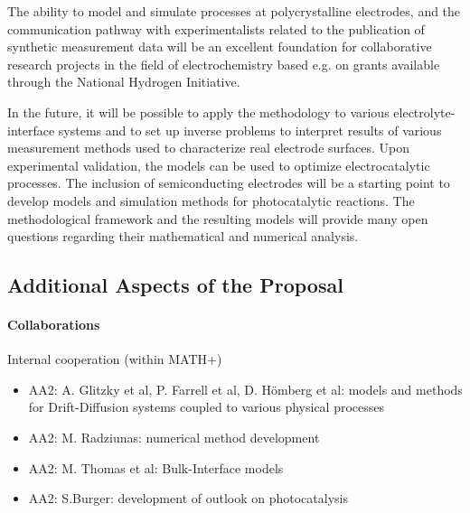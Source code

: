 \documentclass[a4paper,10pt]{article}
\begin{document}
The ability to model and simulate processes at polycrystalline electrodes, and the communication pathway with experimentalists related to the publication of synthetic measurement data will be an excellent foundation
for collaborative research projects in the field of electrochemistry based e.g. on grants available through
the National Hydrogen Initiative.

In the future, it will be possible to apply the methodology to various electrolyte-interface systems
and to set up inverse problems to interpret results of various measurement methods used to characterize real electrode surfaces. Upon experimental validation, the models can be used to optimize electrocatalytic processes.
The inclusion of semiconducting electrodes will be a starting point to develop models and simulation methods
for photocatalytic reactions.
The methodological framework and the resulting models will provide many open questions regarding their
mathematical and numerical analysis.








\subsection*{Additional Aspects of the Proposal}

\paragraph{Collaborations}

Internal cooperation (within MATH+)
\begin{itemize}
\item AA2: A. Glitzky  et al, P. Farrell et al, D. Hömberg et al: models and methods for Drift-Diffusion systems coupled
  to various physical processes
\item AA2: M. Radziunas: numerical method development
\item AA2: M. Thomas et al: Bulk-Interface models
\item AA2: S.Burger: development of outlook on photocatalysis
\end{itemize}
\end{document}
